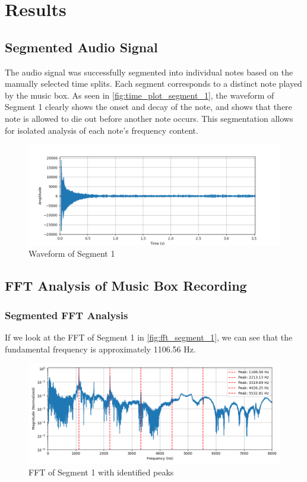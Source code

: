 \chapter{Results}

\section{Segmented Audio Signal}

The audio signal was successfully segmented into individual notes based on the manually selected time splits. Each segment corresponds to a distinct note played by the music box. As seen in \autoref{fig:time_plot_segment_1}, the waveform of Segment 1 clearly shows the onset and decay of the note, and shows that there note is allowed to die out before another note occurs. This segmentation allows for isolated analysis of each note's frequency content.

\begin{figure}[ht]
    \centering
    \includegraphics[width=\textwidth]{data/time_plots/time_plot_segment_1.png}
    \caption{Waveform of Segment 1}
    \label{fig:time_plot_segment_1}
\end{figure}


\section{FFT Analysis of Music Box Recording}

\subsection{Segmented FFT Analysis}

If we look at the FFT of Segment 1 in \autoref{fig:fft_segment_1}, we can see that the fundamental frequency is approximately 1106.56 Hz. 

\begin{figure}[ht]
    \centering
    \includegraphics[width=\textwidth]{data/fft_spectrums/fft_spectrum_segment_1.png}
    \caption{FFT of Segment 1 with identified peaks}
    \label{fig:fft_segment_1}
\end{figure}

